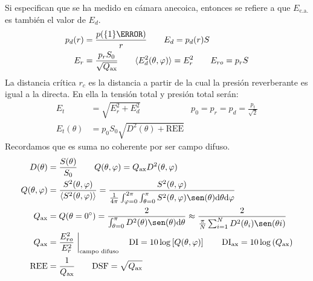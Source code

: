 \documentclass[a4paper, 8pt]{extarticle}
\renewcommand{\sin}{\sen}
\begin{document}
\begin{multicols}{3}
  Si especifican que se ha medido en cámara anecoica, entonces se refiere a que $E_{\text{c.a.}}$ es también el valor de $E_d$.
  \begin{align*}
    p_d (r) & = \frac{p (\qty{1}{\metre } )}{r} \qquad E_d = p_d (r) S                                                                  \\
    E_r     & = \frac{p_r S_0}{\sqrt{Q _{\textnormal{ax}}}} \qquad \langle E_d^2(\theta, \varphi) \rangle = E_r^2 \qquad E_{ro} = p_r S
  \end{align*}
  La distancia crítica $r_c$ es la distancia a partir de la cual la presión reverberante es igual a la directa. En ella la tensión total y presión total serán:
  \begin{align*}
    E_{t}           & = \sqrt{E_r ^2 + E_d ^2}                   & p_0 = p_r = p_d = \frac{p_{t}}{\sqrt{2}} \\
    E_{t} (\theta ) & = p_0 S_0 \sqrt{D^2(\theta ) + \text{REE}}
  \end{align*}
  Recordamos que es suma no coherente por ser campo difuso.
  \begin{align*}
    D( \theta)          & = \frac{S(\theta)}{S_0 } \qquad Q(\theta, \varphi ) = Q _{\textnormal{ax}} D^2                                                    (\theta, \varphi )                                                                              \\
    Q(\theta, \varphi ) & = \frac{S^2(\theta, \varphi )}{\langle S^2(\theta, \varphi) \rangle} = \frac{S^2(\theta, \varphi )}{\frac{1}{4\pi} \int_{\varphi = 0}^{2\pi} \int_{\theta = 0}^{\pi} S^2(\theta, \varphi) \sin (\theta ) \dd \theta \dd \varphi } \\
    Q_{\textnormal{ax}} & = Q(\theta = \ang{0}) = \frac{2}{\int_{\theta = 0}^{\pi} D^2(\theta) \sin (\theta ) \dd \theta } \approx \frac{2}{\frac{\pi}{N} \sum _{i=1}^{N} D^2(\theta _i) \sin (\theta i)}                                                   \\
    Q_{\textnormal{ax}} & = \frac{E^2_{ro}} {E^2_r} \eval*{}_{\text{campo difuso}} \quad \text{DI} = 10 \log \left[ Q( \theta, \varphi) \right] \qquad \text{DI} _{\textnormal{ax}} = 10 \log \left( Q_{\textnormal{ax}} \right)                            \\
    \text{REE}          & = \frac{1}{Q_ {\textnormal{ax}}} \qquad \text{DSF} = \sqrt{Q_{\textnormal{ax}}}                                                                                                                                                   \\
  \end{align*}


\end{multicols}
\end{document}
